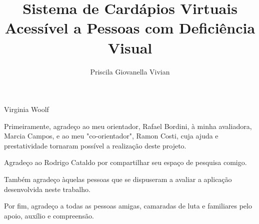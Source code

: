 \documentclass[portuguese,oneside]{tcc}
\author{Priscila Giovanella Vivian}
\title{Sistema de Cardápios Virtuais Acessível a Pessoas com Deficiência Visual}
	{A Virtual Menu System Accessible to Visually Impaired People}
\begin{document}
		
		
		{Virginia Woolf}
		
		
		\begin{agradecimentos}
			
			Primeiramente, agradeço ao meu orientador, Rafael Bordini, à minha avaliadora, Marcia Campos, e ao meu "co-orientador", Ramon Costi, cuja ajuda e prestatividade tornaram possível a realização deste projeto.
			
			Agradeço ao Rodrigo Cataldo por compartilhar seu espaço de pesquisa comigo.
			
			Também agradeço àquelas pessoas que se dispuseram a avaliar a aplicação desenvolvida neste trabalho.
			
			Por fim, agradeço a todas as pessoas amigas, camaradas de luta e familiares pelo apoio, auxílio e compreensão.
		\end{agradecimentos}
		
\end{document}
